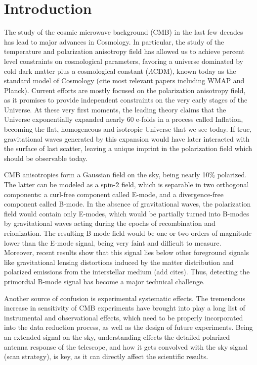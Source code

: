 \documentclass[a4paper,fleqn]{cas-dc}\sloppy
\begin{document}
	\section{Introduction}
	
	The study of the cosmic microwave background (CMB) in the last few decades has lead to major advances in Cosmology. In particular, the study of the temperature and polarization anisotropy field has allowed us to achieve percent level constraints on cosmological parameters, favoring a universe dominated by cold dark matter plus a cosmological constant ($\Lambda$CDM), known today as the standard model of Cosmology {\color{red} (cite most relevant papers including WMAP and Planck)}. Current efforts are mostly focused on the polarization anisotropy field, as it promises to provide independent constraints on the very early stages of the Universe. At these very first moments, the leading theory claims that the Universe exponentially expanded nearly 60 e-folds in a process called Inflation, becoming the flat, homogeneous and isotropic Universe that we see today. If true, gravitational waves generated by this expansion would have later interacted with the surface of last scatter, leaving a unique imprint in the polarization field which should be observable today.
	
	CMB anisotropies form a Gaussian field on the sky, being nearly 10\% polarized. The latter can be modeled as a spin-2 field, which is separable in two orthogonal components: a curl-free component called E-mode, and a divergence-free component called B-mode. In the absence of gravitational waves, the polarization field would contain only E-modes, which would be partially turned into B-modes by gravitational waves acting during the epochs of recombination and reionization. The resulting B-mode field would be one or two orders of magnitude lower than the E-mode signal, being very faint and difficult to measure. Moreover, recent results show that this signal lies below other foreground signals like gravitational lensing distortions induced by the matter distribution and polarized emissions from the interstellar medium {\color{red}(add cites)}. Thus, detecting the primordial B-mode signal has become a major technical challenge.
	
	Another source of confusion is experimental systematic effects. The tremendous increase in sensitivity of CMB experiments have brought into play a long list of instrumental and observational effects, which need to be properly incorporated into the data reduction process, as well as the design of future experiments. Being an extended signal on the sky, understanding effects the detailed polarized antenna response of the telescope, and how it gets convolved with the sky signal (scan strategy), is key, as it can directly affect the scientific results.
	
\end{document}
